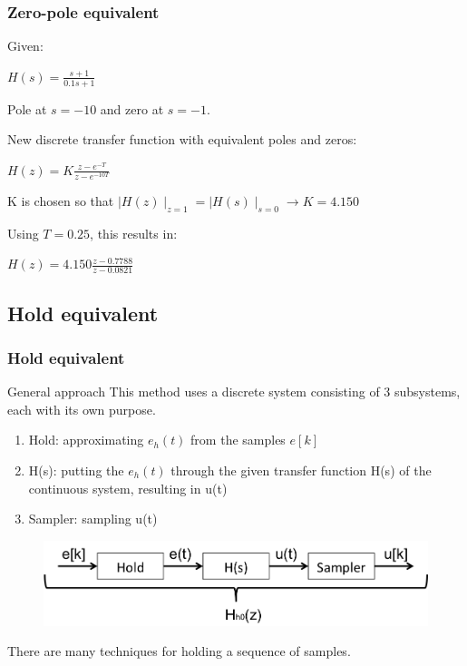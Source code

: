 \begin{frame}
	\frametitle{Zero-pole equivalent}
	\begin{example}
		Given:
		\begin{center}
			$H(s) = \frac{s + 1}{0.1s + 1}$
		\end{center}
		Pole at $s=-10$ and zero at $s=-1$.
		
		New discrete transfer function with equivalent poles and zeros:
		\begin{center}
			$H(z) = K \frac{z - e^{-T}}{z - e^{-10T}}$
		\end{center}
		K is chosen so that $\mid H(z)\mid _{z=1} = \mid H(s) \mid _{s=0} \to K=4.150$

		Using $T=0.25$, this results in:
		\begin{center}
			$H(z) = 4.150 \frac{z-0.7788}{z-0.0821}$
		\end{center}
	\end{example}
\end{frame}


\subsection{Hold equivalent}
\begin{frame}
	\frametitle{Hold equivalent}
	\begin{block}{General approach}
		This method uses a discrete system consisting of 3 subsystems, each with its own purpose. 
		\begin{enumerate}
			\item Hold: approximating $e_h(t)$ from the samples $e[k]$
			\item H(s): putting the $e_h(t)$ through the given transfer function H(s) of the continuous system, resulting in u(t)
			\item Sampler: sampling u(t) 
		\end{enumerate}
		\vspace{-1em}
		\begin{figure}
			\centering
			\includegraphics[width=0.8\linewidth]{hold_equivalent}
		\end{figure}
		\vspace{-1em}
		There are many techniques for holding a sequence of samples.
	\end{block}
\end{frame}

